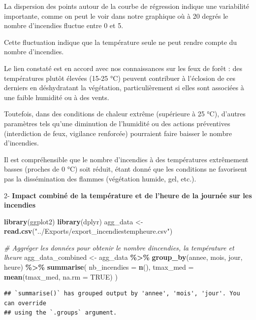 \documentclass[
]{article}
\newenvironment{Shaded}{\begin{snugshade}}{\end{snugshade}}
\newcommand{\AttributeTok}[1]{\textcolor[rgb]{0.13,0.29,0.53}{#1}}
\newcommand{\CommentTok}[1]{\textcolor[rgb]{0.56,0.35,0.01}{\textit{#1}}}
\newcommand{\ConstantTok}[1]{\textcolor[rgb]{0.56,0.35,0.01}{#1}}
\newcommand{\FunctionTok}[1]{\textcolor[rgb]{0.13,0.29,0.53}{\textbf{#1}}}
\newcommand{\NormalTok}[1]{#1}
\newcommand{\OtherTok}[1]{\textcolor[rgb]{0.56,0.35,0.01}{#1}}
\newcommand{\SpecialCharTok}[1]{\textcolor[rgb]{0.81,0.36,0.00}{\textbf{#1}}}
\newcommand{\StringTok}[1]{\textcolor[rgb]{0.31,0.60,0.02}{#1}}
\begin{document}
La dispersion des points autour de la courbe de régression indique une
variabilité importante, comme on peut le voir dans notre graphique où à
20 degrés le nombre d'incendies fluctue entre 0 et 5.

Cette fluctuation indique que la température seule ne peut rendre compte
du nombre d'incendies.

Le lien constaté est en accord avec nos connaissances sur les feux de
forêt : des températures plutôt élevées (15-25 °C) peuvent contribuer à
l'éclosion de ces derniers en déshydratant la végétation,
particulièrement si elles sont associées à une faible humidité ou à des
vents.

Toutefois, dans des conditions de chaleur extrême (supérieure à 25 °C),
d'autres paramètres tels qu'une diminution de l'humidité ou des actions
préventives (interdiction de feux, vigilance renforcée) pourraient faire
baisser le nombre d'incendies.

Il est compréhensible que le nombre d'incendies à des températures
extrêmement basses (proches de 0 °C) soit réduit, étant donné que les
conditions ne favorisent pas la dissémination des flammes (végétation
humide, gel, etc.).

2- \textbf{Impact combiné de la température et de l'heure de la journée
sur les incendies}

\begin{Shaded}
\begin{Highlighting}[]
\FunctionTok{library}\NormalTok{(ggplot2)}
\FunctionTok{library}\NormalTok{(dplyr)}
\NormalTok{agg\_data }\OtherTok{\textless{}{-}} \FunctionTok{read.csv}\NormalTok{(}\StringTok{"../Exports/export\_incendiestempheure.csv"}\NormalTok{)}

\CommentTok{\# Aggréger les données pour obtenir le nombre d\textquotesingle{}incendies, la température et l\textquotesingle{}heure}
\NormalTok{agg\_data\_combined }\OtherTok{\textless{}{-}}\NormalTok{ agg\_data }\SpecialCharTok{\%\textgreater{}\%}
  \FunctionTok{group\_by}\NormalTok{(annee, mois, jour, heure) }\SpecialCharTok{\%\textgreater{}\%}
  \FunctionTok{summarise}\NormalTok{(}
    \AttributeTok{nb\_incendies =} \FunctionTok{n}\NormalTok{(),}
    \AttributeTok{tmax\_med =} \FunctionTok{mean}\NormalTok{(tmax\_med, }\AttributeTok{na.rm =} \ConstantTok{TRUE}\NormalTok{)}
\NormalTok{  )}
\end{Highlighting}
\end{Shaded}

\begin{verbatim}
## `summarise()` has grouped output by 'annee', 'mois', 'jour'. You can override
## using the `.groups` argument.
\end{verbatim}
\end{document}
